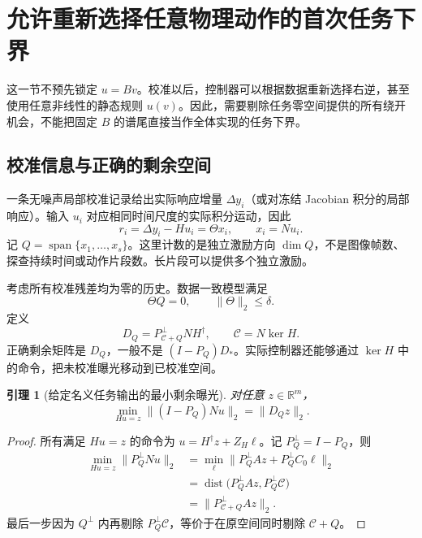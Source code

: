 \documentclass[11pt,a4paper]{article}
\numberwithin{equation}{section}
\newtheorem{lemma}[theorem]{引理}
\theoremstyle{definition}
\begin{document}
\section{允许重新选择任意物理动作的首次任务下界}
\label{sec:cal-minimax}

这一节不预先锁定 $u=Bv$。校准以后，控制器可以根据数据重新选择右逆，甚至使用任意非线性的静态规则 $u(v)$。因此，需要剔除任务零空间提供的所有绕开机会，不能把固定 $B$ 的谱尾直接当作全体实现的任务下界。

\subsection{校准信息与正确的剩余空间}

一条无噪声局部校准记录给出实际响应增量 $\Delta y_i$（或对冻结 Jacobian 积分的局部响应）。输入 $u_i$ 对应相同时间尺度的实际积分运动，因此
\begin{equation}
  r_i=\Delta y_i-Hu_i=\Theta x_i,\qquad x_i=Nu_i .
  \label{eq:cal-probe-oracle}
\end{equation}
记 $Q=\operatorname{span}\{x_1,\ldots,x_s\}$。这里计数的是独立激励方向 $\dim Q$，不是图像帧数、探查持续时间或动作片段数。长片段可以提供多个独立激励。

考虑所有校准残差均为零的历史。数据一致模型满足
\begin{equation}
  \Theta Q=0,\qquad \|\Theta\|_2\le\delta .
  \label{eq:cal-zero-history}
\end{equation}
定义
\begin{equation}
  D_Q=P_{\mathcal C+Q}^{\perp}NH^\dagger,
  \qquad \mathcal C=N\ker H .
  \label{eq:cal-DQ}
\end{equation}
正确剩余矩阵是 $D_Q$，一般不是 $(I-P_Q)D_*$。实际控制器还能够通过 $\ker H$ 中的命令，把未校准曝光移动到已校准空间。

\begin{lemma}[给定名义任务输出的最小剩余曝光]
\label{lem:cal-DQ}
对任意 $z\in\mathbb R^m$，
\begin{equation}
  \min_{Hu=z}\|(I-P_Q)Nu\|_2
  =\|D_Qz\|_2 .
  \label{eq:cal-exposure-z}
\end{equation}
\end{lemma}

\begin{proof}
所有满足 $Hu=z$ 的命令为 $u=H^\dagger z+Z_H\ell$。记 $P_Q^\perp=I-P_Q$，则
\begin{align}
  \min_{Hu=z}\|P_Q^\perp Nu\|_2
  &=
  \min_\ell
  \|P_Q^\perp Az+P_Q^\perp C_0\ell\|_2\\
  &=
  \operatorname{dist}
  \big(P_Q^\perp Az,P_Q^\perp\mathcal C\big)\\
  &=\|P_{\mathcal C+Q}^\perp Az\|_2 .
\end{align}
最后一步因为 $Q^\perp$ 内再剔除 $P_Q^\perp\mathcal C$，等价于在原空间同时剔除 $\mathcal C+Q$。
\end{proof}
\end{document}
